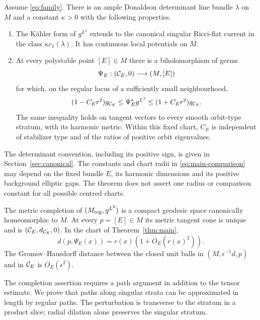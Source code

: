 \begin{theorem}\label{thm:main}
Assume \eqref{eq:family}. There is an ample Donaldson determinant
line bundle $\lambda$ on $M$ and a constant $\kappa>0$ with the
following properties.
\begin{enumerate}
\item The K\"ahler form of $g^{L^2}$ extends to the canonical
singular Ricci-flat current in the class $\kappa c_1(\lambda)$.
It has continuous local potentials on $M$.
\item At every polystable point $[E]\in M$ there is a
biholomorphism of germs
\[
 \Psi_E:(\mathcal C_E,0)\longrightarrow(M,[E])
\]
for which, on the regular locus of a sufficiently small
neighbourhood,
\begin{equation}\label{eq:main-comparison}
 (1-C_Er^2)g_{\mathcal C_E}
 \le \Psi_E^*g^{L^2}
 \le (1+C_Er^2)g_{\mathcal C_E}.
\end{equation}
The same inequality holds on tangent vectors to every smooth
orbit-type stratum, with its harmonic metric. Within this fixed
chart, $C_E$ is independent of stabilizer type and of the ratios
of positive orbit eigenvalues.
\end{enumerate}
\end{theorem}

The determinant convention, including its positive sign, is given
in Section~\ref{sec:canonical}. The constants and chart radii in
\eqref{eq:main-comparison} may depend on the fixed bundle $E$,
its harmonic dimensions and its positive background elliptic
gaps. The theorem does not assert one radius or comparison
constant for all possible centred charts.

\begin{corollary}\label{cor:completion-main}
The metric completion of $(M_{\mathrm{reg}},g^{L^2})$ is a compact geodesic
space canonically homeomorphic to $M$. At every $p=[E]\in M$ its
metric tangent cone is unique and is $(\mathcal C_E,d_{\mathcal C_E},0)$.
In the chart of Theorem~\ref{thm:main},
\begin{equation}\label{eq:radius-main}
 d(p,\Psi_E(x))=r(x)(1+O_E(r(x)^2)).
\end{equation}
The Gromov--Hausdorff distance between the closed unit balls in
$(M,\epsilon^{-1}d,p)$ and in $\mathcal C_E$ is $O_E(\epsilon^2)$.
\end{corollary}

The completion assertion requires a path argument in addition to
the tensor estimate. We prove that paths along singular strata can
be approximated in length by regular paths. The perturbation is
transverse to the stratum in a product slice; radial dilation alone
preserves the singular stratum.

